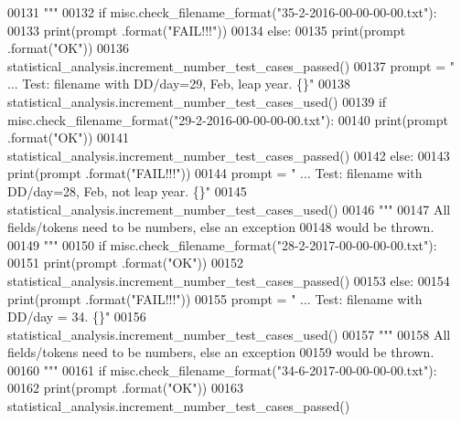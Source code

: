 \begin{DoxyCode}
00131 \textcolor{stringliteral}{        """}
00132         \textcolor{keywordflow}{if} misc.check\_filename\_format(\textcolor{stringliteral}{"35-2-2016-00-00-00-00.txt"}):
00133             print(prompt .format(\textcolor{stringliteral}{"FAIL!!!"}))
00134         \textcolor{keywordflow}{else}:
00135             print(prompt .format(\textcolor{stringliteral}{"OK"}))
00136             statistical\_analysis.increment\_number\_test\_cases\_passed()
00137         prompt = \textcolor{stringliteral}{"  ... Test: filename with DD/day=29, Feb, leap year.  \{\}"}
00138         statistical\_analysis.increment\_number\_test\_cases\_used()
00139         \textcolor{keywordflow}{if} misc.check\_filename\_format(\textcolor{stringliteral}{"29-2-2016-00-00-00-00.txt"}):
00140             print(prompt .format(\textcolor{stringliteral}{"OK"}))
00141             statistical\_analysis.increment\_number\_test\_cases\_passed()
00142         \textcolor{keywordflow}{else}:
00143             print(prompt .format(\textcolor{stringliteral}{"FAIL!!!"}))
00144         prompt = \textcolor{stringliteral}{"  ... Test: filename with DD/day=28, Feb, not leap year.  \{\}"}
00145         statistical\_analysis.increment\_number\_test\_cases\_used()
00146         \textcolor{stringliteral}{"""}
00147 \textcolor{stringliteral}{            All fields/tokens need to be numbers, else an exception}
00148 \textcolor{stringliteral}{                would be thrown.}
00149 \textcolor{stringliteral}{        """}
00150         \textcolor{keywordflow}{if} misc.check\_filename\_format(\textcolor{stringliteral}{"28-2-2017-00-00-00-00.txt"}):
00151             print(prompt .format(\textcolor{stringliteral}{"OK"}))
00152             statistical\_analysis.increment\_number\_test\_cases\_passed()
00153         \textcolor{keywordflow}{else}:
00154             print(prompt .format(\textcolor{stringliteral}{"FAIL!!!"}))
00155         prompt = \textcolor{stringliteral}{"  ... Test: filename with DD/day = 34.            \{\}"}
00156         statistical\_analysis.increment\_number\_test\_cases\_used()
00157         \textcolor{stringliteral}{"""}
00158 \textcolor{stringliteral}{            All fields/tokens need to be numbers, else an exception}
00159 \textcolor{stringliteral}{                would be thrown.}
00160 \textcolor{stringliteral}{        """}
00161         \textcolor{keywordflow}{if} misc.check\_filename\_format(\textcolor{stringliteral}{"34-6-2017-00-00-00-00.txt"}):
00162             print(prompt .format(\textcolor{stringliteral}{"OK"}))
00163             statistical\_analysis.increment\_number\_test\_cases\_passed()

\end{DoxyCode}
